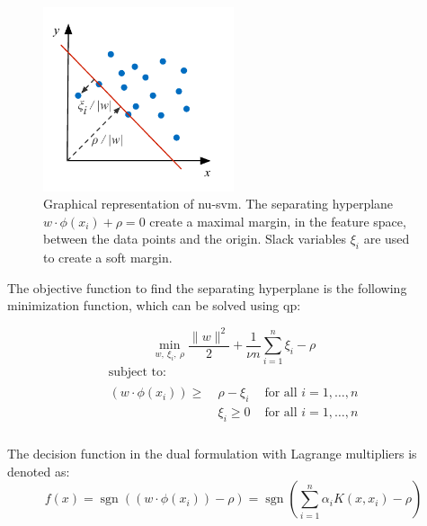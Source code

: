 \begin{figure}
  \centering
    \includegraphics[width=0.5\textwidth,keepaspectratio]{./Figures/chapter3/nu-svm.pdf}
  \caption[$\nu$-Support Vector Machine illustration]{Graphical representation of \gls{nu-svm}. The separating hyperplane $w \cdot \phi(x_i) + \rho = 0$ create a maximal margin, in the feature space, between the data points and the origin. Slack variables $\xi_i$ are used to create a soft margin.}
  \label{fig:nu-svm}
\end{figure}

The objective function to find the separating hyperplane is the following minimization function, which can be solved using \gls{qp}:

\begin{equation}\label{eq:nu-svm_objective}
  \operatorname*{min}_{w,\ \xi_i,\ \rho } \frac{\lVert w \rVert ^2}{2} + \frac{1}{\nu n} \sum_{i=1}^n \xi_i - \rho
\end{equation}
\begin{equation}
  \begin{multlined}
    \mbox{ subject to: } \\
    \begin{aligned}
      (w \cdot \phi(x_i)) \geq \: & \rho - \xi_i & \mbox{ for all } i = 1, \dots, n \\
      & \xi_i \geq 0 & \mbox{ for all } i = 1, \dots, n \\
    \end{aligned}
  \end{multlined}
\end{equation}

The decision function in the dual formulation with Lagrange multipliers is denoted as:
\begin{equation}\label{eq:nu-svm_lagrange}
f(x) = \operatorname{sgn}((w \cdot \phi(x_i)) - \rho) = \operatorname{sgn}( \sum_{i=1}^n \alpha_i K(x, x_i) - \rho)
\end{equation}

